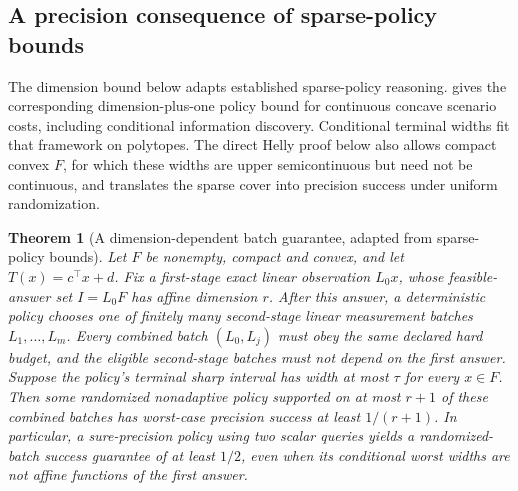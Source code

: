 \documentclass[12pt]{article}
\newtheorem{theorem}{Theorem}
\begin{document}
\subsection{A precision consequence of sparse-policy bounds}
The dimension bound below adapts established sparse-policy reasoning.
\citet[Theorem~2 and Example~5]{kurtz2026} gives the corresponding
dimension-plus-one policy bound for continuous concave scenario costs,
including conditional information discovery. Conditional terminal widths
fit that framework on polytopes. The direct Helly proof below also allows
compact convex $F$, for which these widths are upper semicontinuous but
need not be continuous, and translates the sparse cover into precision
success under uniform randomization.
\begin{theorem}[A dimension-dependent batch guarantee, adapted from sparse-policy bounds]
\label{thm:helly-precision}
Let $F$ be nonempty, compact and convex, and let $T(x)=c^\top x+d$.
Fix a first-stage exact linear observation $L_0x$, whose feasible-answer
set $I=L_0F$ has affine dimension $r$. After this answer, a deterministic
policy chooses one of finitely many second-stage linear measurement
batches $L_1,\ldots,L_m$. Every combined batch $(L_0,L_j)$ must obey the
same declared hard budget, and the eligible second-stage batches must not
depend on the first answer. Suppose the policy's terminal sharp interval
has width at most $\tau$ for every $x\in F$.
Then some randomized nonadaptive policy supported on at most $r+1$
of these combined batches has worst-case precision success at least
$1/(r+1)$.
In particular, a sure-precision policy using two scalar queries yields
a randomized-batch success guarantee of at least $1/2$, even when its
conditional worst widths are not affine functions of the first answer.
\end{theorem}
\end{document}
